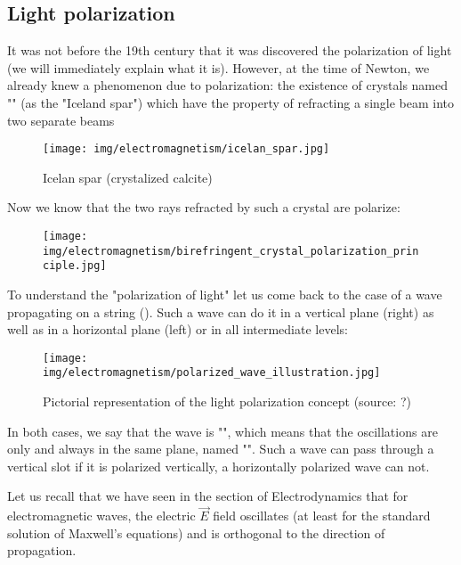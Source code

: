 	\subsection{Light polarization}
	It was not before the 19th century that it was discovered the polarization of light (we will immediately explain what it is). However, at the time of Newton, we already knew a phenomenon due to polarization: the existence of crystals named "" (as the "Iceland spar") which have the property of refracting a single beam into two separate beams
	\begin{figure}[H]
		\centering
		\texttt{[image: img/electromagnetism/icelan\_spar.jpg]}
		\caption{Icelan spar (crystalized calcite)}
	\end{figure}
	Now we know that the two rays refracted by such a crystal are polarize:
	\begin{figure}[H]
		\centering
		\texttt{[image: img/electromagnetism/birefringent\_crystal\_polarization\_principle.jpg]}
	\end{figure}
	To understand the "polarization of light" let us come back to the case of a wave propagating on a string (). Such a wave can do it in a vertical plane (right) as well as in a horizontal plane (left) or in all intermediate levels:
	\begin{figure}[H]
		\centering
		\texttt{[image: img/electromagnetism/polarized\_wave\_illustration.jpg]}
		\caption{Pictorial representation of the light polarization concept (source: ?)}
	\end{figure}
	In both cases, we say that the wave is "", which means that the oscillations are only and always in the same plane, named "". Such a wave can pass through a vertical slot if it is polarized vertically, a horizontally polarized wave can not.

	Let us recall that we have seen in the section of Electrodynamics that for electromagnetic waves, the electric $\vec{E}$ field oscillates (at least for the standard solution of Maxwell's equations) and is orthogonal to the direction of propagation.
	
